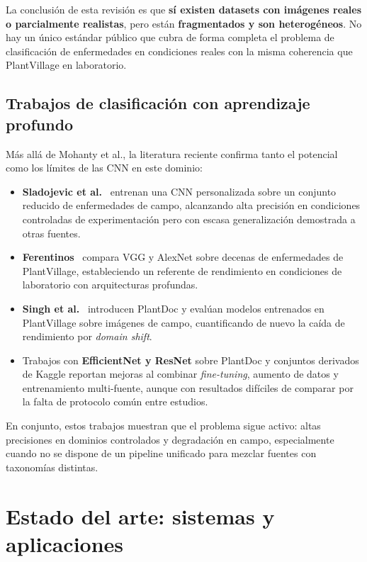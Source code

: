 \documentclass[11pt,spanish,listoffigures,listoftables]{tfgetsinf}
\begin{document}
La conclusión de esta revisión es que \textbf{sí existen datasets con imágenes reales o parcialmente realistas}, pero están \textbf{fragmentados y son heterogéneos}. No hay un único estándar público que cubra de forma completa el problema de clasificación de enfermedades en condiciones reales con la misma coherencia que PlantVillage en laboratorio.

\subsection{Trabajos de clasificación con aprendizaje profundo}

Más allá de Mohanty et al., la literatura reciente confirma tanto el potencial como los límites de las CNN en este dominio:

\begin{itemize}
    \item \textbf{Sladojevic et al.}~\cite{sladojevic2016} entrenan una CNN personalizada sobre un conjunto reducido de enfermedades de campo, alcanzando alta precisión en condiciones controladas de experimentación pero con escasa generalización demostrada a otras fuentes.
    \item \textbf{Ferentinos}~\cite{ferentinos2018} compara VGG y AlexNet sobre decenas de enfermedades de PlantVillage, estableciendo un referente de rendimiento en condiciones de laboratorio con arquitecturas profundas.
    \item \textbf{Singh et al.}~\cite{plantdoc2020} introducen PlantDoc y evalúan modelos entrenados en PlantVillage sobre imágenes de campo, cuantificando de nuevo la caída de rendimiento por \textit{domain shift}.
    \item Trabajos con \textbf{EfficientNet y ResNet} sobre PlantDoc y conjuntos derivados de Kaggle reportan mejoras al combinar \textit{fine-tuning}, aumento de datos y entrenamiento multi-fuente, aunque con resultados difíciles de comparar por la falta de protocolo común entre estudios.
\end{itemize}

En conjunto, estos trabajos muestran que el problema sigue activo: altas precisiones en dominios controlados y degradación en campo, especialmente cuando no se dispone de un pipeline unificado para mezclar fuentes con taxonomías distintas.

\section{Estado del arte: sistemas y aplicaciones}
\end{document}
